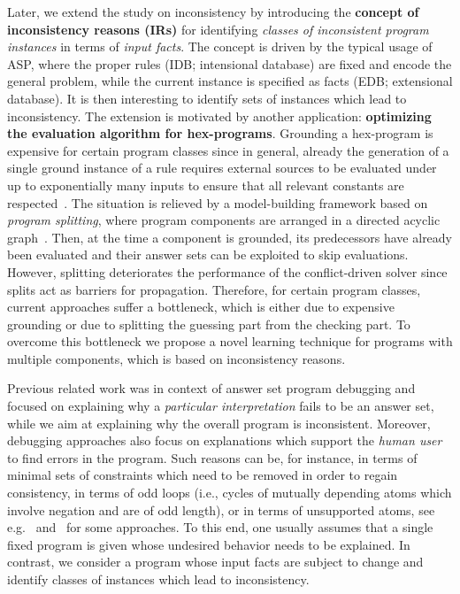 \documentclass[11pt,fleqn,twoside]{article}
\newcommand\hex{{\sc hex}\xspace}
\begin{document}
		Later, we extend the study on inconsistency by
		introducing the \textbf{concept of inconsistency reasons (IRs)} for
		identifying \emph{classes of inconsistent program instances} in terms of
		\emph{input facts}.
		The concept is driven by the typical usage of ASP,
		where the proper rules (IDB; intensional database) are fixed and encode the general problem,
		while the current instance is specified as facts (EDB; extensional database).
		It is then interesting to identify sets of instances which lead to inconsistency.
		The extension is motivated by another application: \textbf{optimizing the evaluation algorithm for \hex-programs}.
		Grounding a \hex-program is expensive for certain program classes since in general,
		already the generation of a single ground instance of a rule requires
		external sources to be evaluated under up to exponentially many inputs to ensure that all relevant constants are respected~\cite{efkr2016-aij}.
		The situation is relieved by
		a model-building framework based on \emph{program splitting},
		where program components are arranged in a directed acyclic graph~\cite{efikrs2016-tplp}.
		Then, at the time a component is grounded, its predecessors
		have already been evaluated and their answer sets can be exploited to skip evaluations.
		However, splitting deteriorates the performance of the conflict-driven solver
		since splits act as barriers for propagation.
		Therefore, for certain program classes, current approaches suffer a bottleneck, which is either due to expensive grounding or due to splitting the guessing part from the checking part.
		To overcome this bottleneck we propose a novel learning technique for programs with multiple components, which is based on inconsistency reasons.

		Previous related work was in context of answer set program debugging and
		focused on explaining why a \emph{particular interpretation} fails to be an answer set,
		while we aim at explaining why the overall program is inconsistent.
		Moreover, debugging approaches also focus on explanations
		which support the \emph{human user} to find errors in the program.
		Such reasons can be, for instance, in terms of minimal sets of constraints which need to be removed in order to regain consistency,
		in terms of odd loops (i.e., cycles of mutually depending atoms which involve negation and are of odd length), or in terms of unsupported atoms, see e.g.~
		and~ for some approaches.
		To this end, one usually assumes that a single fixed program is given whose undesired behavior needs to be explained.
		In contrast, we consider a program whose input facts are subject to change
		and identify classes of instances which lead to inconsistency.
\end{document}
